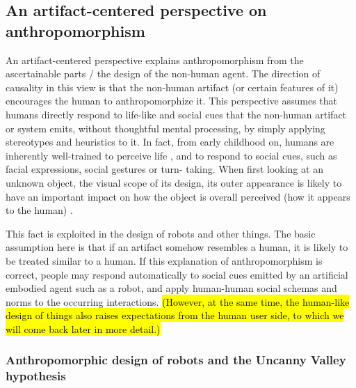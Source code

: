 \documentclass{frontiersSCNS} %
\begin{document}
%
%
%
%
%
%

\subsection{An artifact-centered perspective on anthropomorphism}
\label{sec:anthropomorphic-design}

An artifact-centered perspective explains anthropomorphism from the ascertainable 
parts / the design of the non-human agent.
The direction of causality in this view is that the non-human artifact (or certain 
features of it) encourages the human to anthropomorphize it.
This perspective assumes that humans directly respond to life-like and social cues 
that the non-human artifact or system emits, without thoughtful mental processing, 
by simply applying stereotypes and heuristics to it. In fact, from early childhood 
on, humans are inherently well-trained to perceive life \citep{epley_seeing_2007}, 
and to respond to social cues, such as facial expressions, social gestures or turn-
taking. When first looking at an unknown object, the visual scope of its design, 
its outer appearance is likely to have an important impact on how the object is 
overall perceived (how it appears to the human) \citep{schmitz_concepts_2011}.

This fact is exploited in the design of robots and other things. The basic 
assumption  here is that if an artifact 
somehow resembles a human, it is likely to be treated similar to a human. If this 
explanation of anthropomorphism is correct, people may respond automatically to 
social cues emitted by an artificial embodied agent such as a robot, and apply 
human-human social schemas and norms to the occurring interactions. \hl{(However, at 
the same time, the human-like design of things also raises expectations from the 
human user side, to which we will come back later in more detail.)}


\subsubsection{Anthropomorphic design of robots and the Uncanny Valley hypothesis\\}

\end{document}

